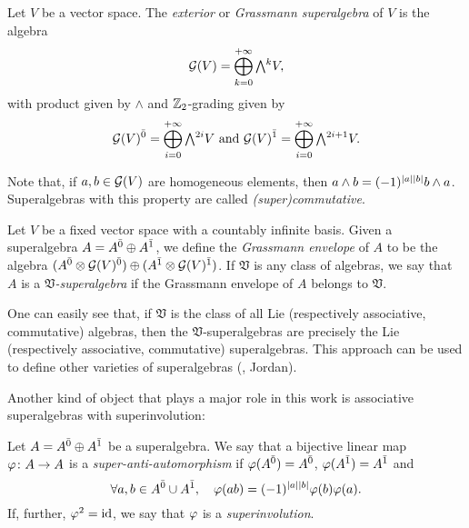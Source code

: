 \begin{defi}\label{def:Grassmann-algebra}
	Let $V$ be a vector space. 
	The \emph{exterior} or \emph{Grassmann superalgebra} of $V$ is the algebra
	\[\mc G(V) = \bigoplus_{k=0}^{+\infty} \Exterior^k V,\]
	with product given by $\wedge$ and $\mathbb{Z}_2$-grading given by 
	\[
	    \mc G(V)\even = \bigoplus_{i=0}^{+\infty}\Exterior^{2i} V \,\AND\, \mc G(V)\odd = \bigoplus_{i=0}^{+\infty}\Exterior^{2i+1} V.
	\]
\end{defi}

Note that, if $a,b \in \mathcal G(V)$ are homogeneous elements, then $a \wedge b = (-1)^{|a||b|} b \wedge a$. 
Superalgebras with this property are called \emph{(super)commutative}. 

\begin{defi}\label{Grassmann-envelope}
    Let $V$ be a fixed vector space with a countably infinite basis. 
    Given a superalgebra $A = A^{\bar0} \oplus A^{\bar1}$, we define the \emph{Grassmann envelope} of $A$ to be the algebra $(A^{\bar0}\otimes \mathcal G(V)^{\bar0}) \oplus (A^{\bar1}\otimes \mathcal G(V)^{\bar1})$. 
    If $\mathfrak{V}$ is any class of algebras, we say that $A$ is a \emph{$\mathfrak{V}$-superalgebra} if the Grassmann envelope of $A$ belongs to $\mathfrak{V}$. 
\end{defi}

One can easily see that, if $\mathfrak{V}$ is the class of all Lie (respectively associative, commutative) algebras, then the $\mathfrak{V}$-superalgebras are precisely the Lie (respectively associative, commutative) superalgebras. 
This approach can be used to define other varieties of superalgebras (\eg, Jordan). 

Another kind of object that plays a major role in this work is associative superalgebras with superinvolution:

\begin{defi}\label{def:super-anti-automorphism}
    Let $A = A^{\bar0} \oplus A^{\bar1}$ be a superalgebra. 
    We say that a bijective linear map $\varphi\colon A \to A$ is a \emph{super-anti-automorphism} if $\varphi(A^{\bar0}) = A^{\bar0}$, $\varphi(A^{\bar1}) = A^{\bar1}$ and
    \[\label{eq:super-anti-automorphism}
        \forall a,b \in A^{\bar0} \cup A^{\bar1}, \quad \varphi(ab) = (-1)^{|a||b|} \varphi(b)\varphi(a).
    \]
    If, further, $\varphi^2 = \operatorname{id}$, we say that $\varphi$ is a \emph{superinvolution}. 
\end{defi}

